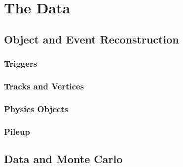 \chapter{The Data}

\section{Object and Event Reconstruction}

\subsection*{Triggers}

\subsection*{Tracks and Vertices}

\subsection*{Physics Objects}

\subsection*{Pileup}

\section{Data and Monte Carlo}